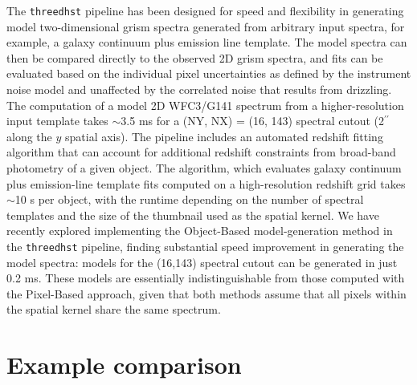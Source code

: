 \documentclass[preprint]{aastex}
\begin{document}



The \texttt{threedhst} pipeline has been designed for speed and flexibility in generating model two-dimensional grism spectra generated from arbitrary input spectra, for example, a galaxy continuum plus emission line template.  The model spectra can then be compared directly to the observed 2D grism spectra, and fits can be evaluated based on the individual pixel uncertainties as defined by the instrument noise model and unaffected by the correlated noise that results from drizzling.  The computation of a model 2D WFC3/G141 spectrum from a higher-resolution input template takes $\sim$3.5 ms for a (NY, NX) = (16, 143) spectral cutout (2$^{\prime\prime}$ along the $y$ spatial axis).  The pipeline includes an automated redshift fitting algorithm that can account for additional redshift constraints from broad-band photometry of a given object.  The algorithm, which evaluates galaxy continuum plus emission-line template fits computed on a high-resolution redshift grid takes $\sim$10 s per object, with the runtime depending on the number of spectral templates and the size of the thumbnail used as the spatial kernel.  We have recently explored implementing the Object-Based model-generation method in the \texttt{threedhst} pipeline, finding substantial speed improvement in generating the model spectra:  models for the (16,143) spectral cutout can be generated in just 0.2 ms.  These models are essentially indistinguishable from those computed with the Pixel-Based approach, given that both methods assume that all pixels within the spatial kernel share the same spectrum.  

\section{Example comparison}
\end{document}
